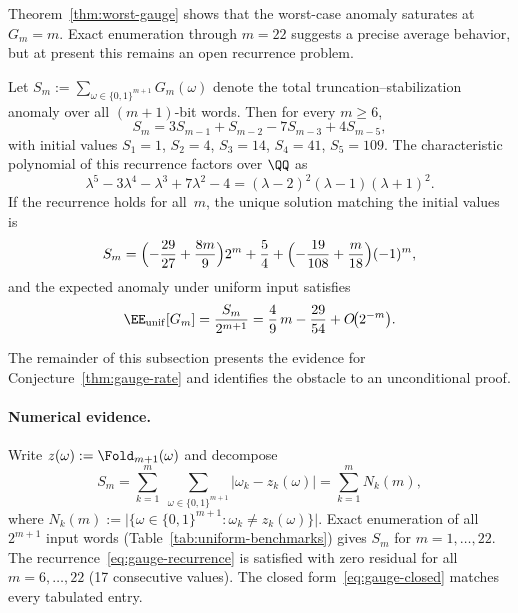 Theorem~\ref{thm:worst-gauge} shows that the worst-case anomaly saturates at $G_m=m$. Exact enumeration through $m=22$ suggests a precise average behavior, but at present this remains an open recurrence problem.

\begin{conjecture}\label{thm:gauge-rate}
Let $S_m:=\sum_{\omega\in\{0,1\}^{m+1}}G_m(\omega)$ denote the total truncation--stabilization anomaly over all $(m{+}1)$-bit words. Then for every $m\ge 6$,
\begin{equation}\label{eq:gauge-recurrence}
S_m = 3S_{m-1}+S_{m-2}-7S_{m-3}+4S_{m-5},
\end{equation}
with initial values $S_1=1$, $S_2=4$, $S_3=14$, $S_4=41$, $S_5=109$. The characteristic polynomial of this recurrence factors over $\QQ$ as
\begin{equation}\label{eq:gauge-charpoly}
\lambda^5-3\lambda^4-\lambda^3+7\lambda^2-4
=
(\lambda-2)^2(\lambda-1)(\lambda+1)^2.
\end{equation}
If the recurrence holds for all~$m$, the unique solution matching the initial values is
\begin{equation}\label{eq:gauge-closed}
S_m
=
\Bigl(-\frac{29}{27}+\frac{8m}{9}\Bigr)2^m
+\frac{5}{4}
+\Bigl(-\frac{19}{108}+\frac{m}{18}\Bigr)(-1)^m,
\end{equation}
and the expected anomaly under uniform input satisfies
\begin{equation}\label{eq:gauge-slope}
\EE_{\mathrm{unif}}[G_m]
=
\frac{S_m}{2^{m+1}}
=
\frac{4}{9}\,m
-\frac{29}{54}
+O\!\bigl(2^{-m}\bigr).
\end{equation}
\end{conjecture}

The remainder of this subsection presents the evidence for Conjecture~\ref{thm:gauge-rate} and identifies the obstacle to an unconditional proof.

\paragraph{Numerical evidence.}
Write $z(\omega):=\Fold_{m+1}(\omega)$ and decompose
\[
S_m
=
\sum_{k=1}^{m}\;\sum_{\omega\in\{0,1\}^{m+1}}
\bigl|\omega_k-z_k(\omega)\bigr|
=
\sum_{k=1}^{m} N_k(m),
\]
where $N_k(m):=\bigl|\bigl\{\omega\in\{0,1\}^{m+1}:\omega_k\neq z_k(\omega)\bigr\}\bigr|$. Exact enumeration of all $2^{m+1}$ input words (Table~\ref{tab:uniform-benchmarks}) gives $S_m$ for $m=1,\ldots,22$. The recurrence~\eqref{eq:gauge-recurrence} is satisfied with zero residual for all $m=6,\ldots,22$ (17 consecutive values). The closed form~\eqref{eq:gauge-closed} matches every tabulated entry.

